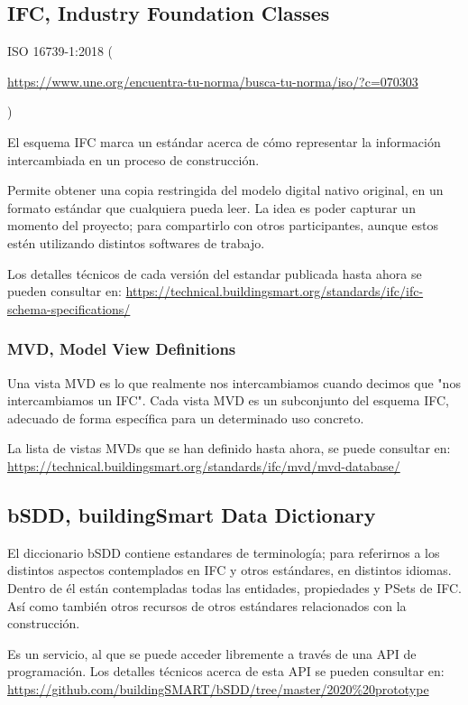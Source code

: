 \documentclass[spanish,10pt,a4paper,final,oneside]{article}
\begin{document}
\subsection{IFC, Industry Foundation Classes}
ISO 16739-1:2018 (\begin{tiny}\url{https://www.une.org/encuentra-tu-norma/busca-tu-norma/iso/?c=070303}\end{tiny})

El esquema IFC marca un estándar acerca de cómo representar la información intercambiada en un proceso de construcción.

Permite obtener una copia restringida del modelo digital nativo original, en un formato estándar que cualquiera pueda leer. La idea es poder capturar un momento del proyecto; para compartirlo con otros participantes, aunque estos estén utilizando distintos softwares de trabajo. 

Los detalles técnicos de cada versión del estandar publicada hasta ahora se pueden consultar en: \url{https://technical.buildingsmart.org/standards/ifc/ifc-schema-specifications/}


\subsubsection{\textbf{MVD}, Model View Definitions}
Una vista MVD es lo que realmente nos intercambiamos cuando decimos que "nos intercambiamos un IFC". Cada vista MVD es un subconjunto del esquema IFC, adecuado de forma específica para un determinado uso concreto.

La lista de vistas MVDs que se han definido hasta ahora, se puede consultar en: \url{https://technical.buildingsmart.org/standards/ifc/mvd/mvd-database/}


\subsection{\textbf{bSDD}, buildingSmart Data Dictionary}
El diccionario bSDD contiene estandares de terminología; para referirnos a los distintos aspectos contemplados en IFC y otros estándares, en distintos idiomas.
\\Dentro de él están contempladas todas las entidades, propiedades y PSets de IFC. Así como también otros recursos de otros estándares relacionados con la construcción.

Es un servicio, al que se puede acceder libremente a través de una API de programación. Los detalles técnicos acerca de esta API se pueden consultar en: \url{https://github.com/buildingSMART/bSDD/tree/master/2020%20prototype}
\end{document}
